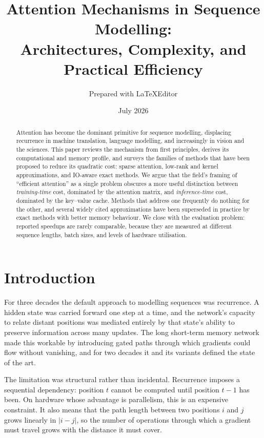 \documentclass[11pt,a4paper]{article}
\title{Attention Mechanisms in Sequence Modelling:\\
       Architectures, Complexity, and Practical Efficiency}
\author{Prepared with LaTeXEditor}
\date{July 2026}
\begin{document}
\maketitle

\begin{abstract}
Attention has become the dominant primitive for sequence modelling, displacing
recurrence in machine translation, language modelling, and increasingly in
vision and the sciences. This paper reviews the mechanism from first
principles, derives its computational and memory profile, and surveys the
families of methods that have been proposed to reduce its quadratic cost:
sparse attention, low-rank and kernel approximations, and IO-aware exact
methods. We argue that the field's framing of ``efficient attention'' as a
single problem obscures a more useful distinction between \emph{training-time}
cost, dominated by the attention matrix, and \emph{inference-time} cost,
dominated by the key--value cache. Methods that address one frequently do
nothing for the other, and several widely cited approximations have been
superseded in practice by exact methods with better memory behaviour. We close
with the evaluation problem: reported speedups are rarely comparable, because
they are measured at different sequence lengths, batch sizes, and levels of
hardware utilisation.
\end{abstract}

\tableofcontents

\section{Introduction}
\label{sec:intro}

For three decades the default approach to modelling sequences was recurrence.
A hidden state was carried forward one step at a time, and the network's
capacity to relate distant positions was mediated entirely by that state's
ability to preserve information across many updates. The long short-term
memory network \cite{hochreiter1997} made this workable by introducing gated
paths through which gradients could flow without vanishing, and for two
decades it and its variants defined the state of the art.

The limitation was structural rather than incidental. Recurrence imposes a
sequential dependency: position $t$ cannot be computed until position $t-1$
has been. On hardware whose advantage is parallelism, this is an expensive
constraint. It also means that the path length between two positions $i$ and
$j$ grows linearly in $|i - j|$, so the number of operations through which a
gradient must travel grows with the distance it must cover.
\end{document}
